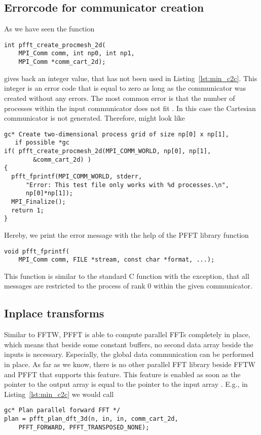 \subsection{Errorcode for communicator creation}
As we have seen the function
\begin{lstlisting}
int pfft_create_procmesh_2d(
    MPI_Comm comm, int np0, int np1,
    MPI_Comm *comm_cart_2d);
\end{lstlisting}
gives back an integer value, that has not been used in Listing~\ref{lst:min_c2c}.
This integer is an error code that is equal to zero as long as the communicator was created
without any errors. The most common error is that the number of processes within the input
communicator  does not fit . In this case the Cartesian communicator
is not generated. Therefore, might look like
\begin{lstlisting}
gc* Create two-dimensional process grid of size np[0] x np[1],
   if possible *gc
if( pfft_create_procmesh_2d(MPI_COMM_WORLD, np[0], np[1],
        &comm_cart_2d) )
{
  pfft_fprintf(MPI_COMM_WORLD, stderr,
      "Error: This test file only works with %d processes.\n",
      np[0]*np[1]);
  MPI_Finalize();
  return 1;
}
\end{lstlisting}
Hereby, we print the error message with the help of the PFFT library function
\begin{lstlisting}
void pfft_fprintf(
    MPI_Comm comm, FILE *stream, const char *format, ...);
\end{lstlisting}
This function is similar to the standard C function  with the exception, that all messages are restricted
to the process of rank $0$ within the given communicator.

\subsection{Inplace transforms}
Similar to FFTW, PFFT is able to compute parallel FFTs completely in place, which means that beside some
constant buffers, no second data array beside the inputs is necessary. Especially, the global data communication
can be performed in place. As far as we know, there is no other parallel FFT library beside FFTW and PFFT that
supports this feature. 
This feature is enabled as soon as the pointer to the output array  is equal to the pointer to the input array .
E.g., in Listing~\ref{lst:min_c2c} we would call
\begin{lstlisting}[firstnumber=34]
gc* Plan parallel forward FFT */
plan = pfft_plan_dft_3d(n, in, in, comm_cart_2d,
    PFFT_FORWARD, PFFT_TRANSPOSED_NONE);
\end{lstlisting}

